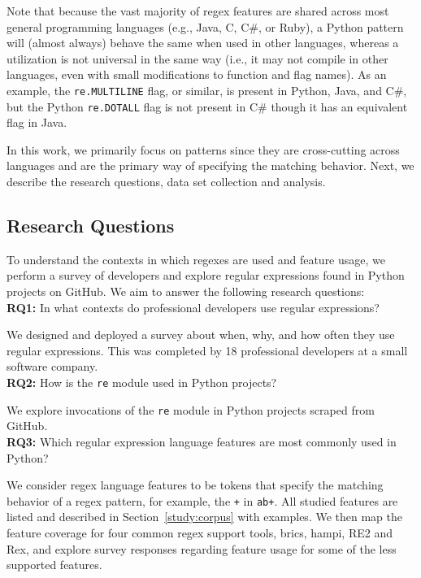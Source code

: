 Note that because the vast majority of regex features are shared across most general programming languages (e.g., Java, C, C\#, or Ruby), a Python {pattern} will (almost always) behave the same when used in other languages, whereas a utilization is not universal in the same way (i.e., it may not compile in other languages, even with small modifications to function and flag names).
As an example, the {\tt re.MULTILINE} flag, or similar, is present in Python, Java, and C\#, but  the Python {\tt re.DOTALL} flag is not present in C\# though it has an equivalent flag in Java.

In this work, we primarily focus on patterns since they are cross-cutting across languages and are the primary way of specifying the matching behavior. Next, we describe the research questions, data set collection and analysis.

\subsection{Research Questions}
\label{sec:rqs}
To understand the contexts in which regexes are used  and feature usage, we perform a survey of developers and explore regular expressions found in Python projects on GitHub. We aim to answer the following research questions:\\

\noindent \textbf{RQ1:} In what contexts do professional developers use regular expressions?

We designed and deployed a survey about when, why, and how often they use regular expressions. This was completed by 18 professional developers at a small software company.\\

\noindent \textbf{RQ2:} How  is the {\tt re} module used in Python projects?

We explore invocations of  the {\tt re} module in  Python projects scraped from GitHub.\\


\noindent \textbf{RQ3:} Which regular expression language features are most commonly used in Python?

We consider regex language features to be tokens that specify the matching behavior of a regex pattern, for example,  the {\tt +} in {\tt ab+}.  All studied features are listed and described in Section~\ref{study:corpus} with examples. We then map the feature coverage for four common regex support tools, brics, hampi, RE2 and Rex, and explore survey responses regarding feature usage for some of the less supported features.\\

